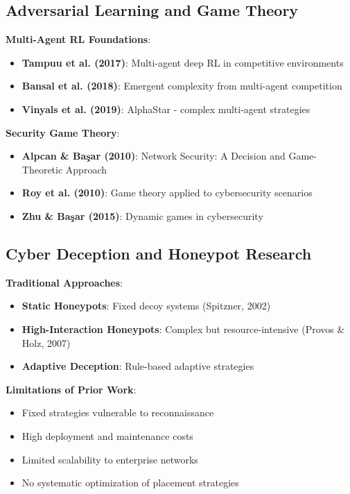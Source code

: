 \documentclass[11pt]{article}
\begin{document}
\subsection{Adversarial Learning and Game Theory}

\begin{mathdetails}
\textbf{Multi-Agent RL Foundations}:
\begin{itemize}
\item \textbf{Tampuu et al. (2017)}: Multi-agent deep RL in competitive environments
\item \textbf{Bansal et al. (2018)}: Emergent complexity from multi-agent competition
\item \textbf{Vinyals et al. (2019)}: AlphaStar - complex multi-agent strategies
\end{itemize}

\textbf{Security Game Theory}:
\begin{itemize}
\item \textbf{Alpcan \& Başar (2010)}: Network Security: A Decision and Game-Theoretic Approach
\item \textbf{Roy et al. (2010)}: Game theory applied to cybersecurity scenarios
\item \textbf{Zhu \& Başar (2015)}: Dynamic games in cybersecurity
\end{itemize}
\end{mathdetails}

\subsection{Cyber Deception and Honeypot Research}

\begin{example}
\textbf{Traditional Approaches}:
\begin{itemize}
\item \textbf{Static Honeypots}: Fixed decoy systems (Spitzner, 2002)
\item \textbf{High-Interaction Honeypots}: Complex but resource-intensive (Provos \& Holz, 2007)
\item \textbf{Adaptive Deception}: Rule-based adaptive strategies
\end{itemize}

\textbf{Limitations of Prior Work}:
\begin{itemize}
\item Fixed strategies vulnerable to reconnaissance
\item High deployment and maintenance costs
\item Limited scalability to enterprise networks
\item No systematic optimization of placement strategies
\end{itemize}
\end{example}
\end{document}
